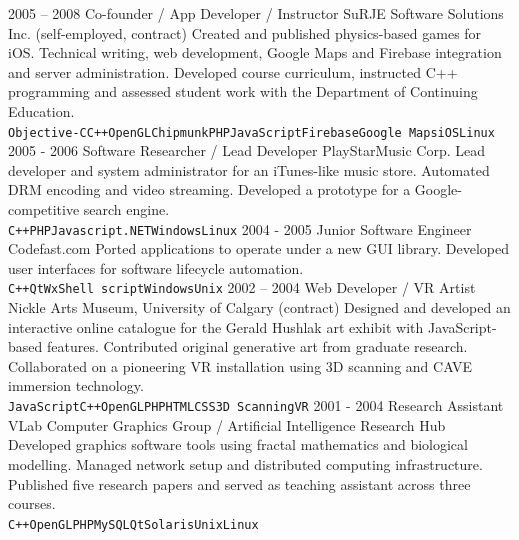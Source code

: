 \documentclass[9pt]{developercv}
\begin{document}
\begin{entrylist}
	\entry
		{2005 -- 2008}
		{Co-founder / App Developer / Instructor}
		{SuRJE Software Solutions Inc. (self-employed, contract)}
		{Created and published physics-based games for iOS. Technical writing, web development, Google Maps and Firebase integration and server administration. Developed course curriculum, instructed C++ programming and assessed student work with the Department of Continuing Education.\\ \texttt{Objective-C}\slashsep\texttt{C++}\slashsep\texttt{OpenGL}\slashsep\texttt{Chipmunk}\slashsep\texttt{PHP}\slashsep\texttt{JavaScript}\slashsep\texttt{Firebase}\slashsep\texttt{Google Maps}\slashsep\texttt{iOS}\slashsep\texttt{Linux}}
	\entry
		{2005 - 2006}
		{Software Researcher / Lead Developer}
		{PlayStarMusic Corp.}
		{Lead developer and system administrator for an iTunes-like music store. Automated DRM encoding and video streaming. Developed a prototype for a Google-competitive search engine.\\ \texttt{C++}\slashsep\texttt{PHP}\slashsep\texttt{Javascript}\slashsep\texttt{.NET}\slashsep\texttt{Windows}\slashsep\texttt{Linux}}
	\entry
		{2004 - 2005}
		{Junior Software Engineer}
		{Codefast.com}
		{Ported applications to operate under a new GUI library. Developed user interfaces for software lifecycle automation.\\ \texttt{C++}\slashsep\texttt{Qt}\slashsep\texttt{Wx}\slashsep\texttt{Shell script}\slashsep\texttt{Windows}\slashsep\texttt{Unix}}
	\entry
		{2002 -- 2004}
		{Web Developer / VR Artist}
		{Nickle Arts Museum, University of Calgary (contract)}
		{Designed and developed an interactive online catalogue for the Gerald Hushlak art exhibit with JavaScript-based features. Contributed original generative art from graduate research. Collaborated on a pioneering VR installation using 3D scanning and CAVE immersion technology.\\ \texttt{JavaScript}\slashsep\texttt{C++}\slashsep\texttt{OpenGL}\slashsep\texttt{PHP}\slashsep\texttt{HTML}\slashsep\texttt{CSS}\slashsep\texttt{3D Scanning}\slashsep\texttt{VR}}
	\entry
		{2001 - 2004}
		{Research Assistant}
		{VLab Computer Graphics Group / Artificial Intelligence Research Hub}
		{Developed graphics software tools using fractal mathematics and biological modelling. Managed network setup and distributed computing infrastructure. Published five research papers and served as teaching assistant across three courses.\\ \texttt{C++}\slashsep\texttt{OpenGL}\slashsep\texttt{PHP}\slashsep\texttt{MySQL}\slashsep\texttt{Qt}\slashsep\texttt{Solaris}\slashsep\texttt{Unix}\slashsep\texttt{Linux}}
\end{entrylist}
\end{document}
